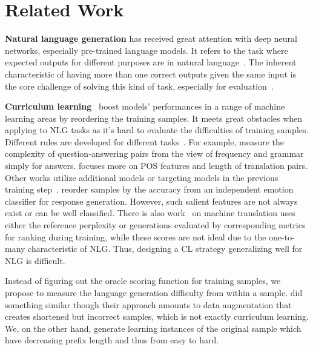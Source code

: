 \section{Related Work}
\textbf{Natural language generation} has received great attention with deep neural networks, especially pre-trained language models. It refers to the task where expected outputs for different purposes are in natural language~\cite{dong2021survey}. The inherent characteristic of having more than one correct outputs given the same input is the core challenge of solving this kind of task, especially for evaluation~\cite{singh2018does}.



\textbf{Curriculum learning}~\cite{bengio2009curriculum} boost models' performances in a range of machine learning areas by reordering the training samples.
It meets great obstacles when applying to NLG tasks as it's hard to evaluate the difficulties of training samples. 
Different rules are developed for different tasks~\cite{platanios2019competence,chang2021does}. For example, \cite{liu2018curriculum} measure the complexity of question-answering pairs from the view of frequency and grammar simply for answers. \cite{kocmi2017curriculum} focuses more on POS features and length of translation pairs.
Other works utilize additional models or targeting models in the previous training step~\cite{zhang-etal-2019-curriculum,zhang2018empirical}. \cite{shen2020cdl} reorder samples by the accuracy from an independent emotion classifier for response generation. However, such salient features are not always exist or can be well classified. There is also work~\cite{zhou2020uncertainty} on machine translation uses either the reference perplexity or generations evaluated by corresponding metrics for ranking during training, while these scores are not ideal due to the one-to-many characteristic of NLG. 
Thus, designing a CL strategy generalizing well for NLG is difficult.

Instead of figuring out the oracle scoring function for training samples, 
we propose to measure the language generation difficulty from within a sample. 
\citet{liang-etal-2021-token-wise} did something similar though their approach
amounts to data augmentation that creates shortened but incorrect samples, which is
not exactly curriculum learning. We, on the other hand, generate learning instances
of the original sample which have decreasing prefix length and thus from easy to hard.
